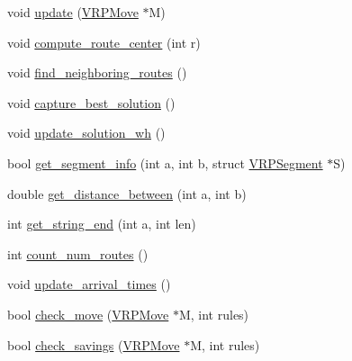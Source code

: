 \begin{DoxyCompactItemize}
\item 
void \hyperlink{class_v_r_p_a6046e20fffcbd601a1f02a42a1a92a0c}{update} (\hyperlink{class_v_r_p_move}{VRPMove} $\ast$M)
\item 
void \hyperlink{class_v_r_p_ae691693a774a5012bb7e77fc9fdee918}{compute\_\-route\_\-center} (int r)
\item 
void \hyperlink{class_v_r_p_acee4564d9d4ed7ddce32ecc7def8b623}{find\_\-neighboring\_\-routes} ()
\item 
void \hyperlink{class_v_r_p_a1de9915c296a739ee5b1e5338889434c}{capture\_\-best\_\-solution} ()
\item 
void \hyperlink{class_v_r_p_a4cd15e9a1a08aeb112bb60ead67f689f}{update\_\-solution\_\-wh} ()
\item 
bool \hyperlink{class_v_r_p_af96ea632c4f247d8430b44a1dd49f2d0}{get\_\-segment\_\-info} (int a, int b, struct \hyperlink{struct_v_r_p_segment}{VRPSegment} $\ast$S)
\item 
double \hyperlink{class_v_r_p_ac43dd1c3af478740817c4e6e4e1e54e7}{get\_\-distance\_\-between} (int a, int b)
\item 
int \hyperlink{class_v_r_p_a6f6c6973bc8fdda2fdb499b35b715f31}{get\_\-string\_\-end} (int a, int len)
\item 
int \hyperlink{class_v_r_p_a6f937aafe71c8de3408386f12bbb1e7c}{count\_\-num\_\-routes} ()
\item 
void \hyperlink{class_v_r_p_aa5233a27a24a804a69c973247c684557}{update\_\-arrival\_\-times} ()
\item 
bool \hyperlink{class_v_r_p_a1c10f1c6714cb3d1215c7f2c4f877b8c}{check\_\-move} (\hyperlink{class_v_r_p_move}{VRPMove} $\ast$M, int rules)
\item 
bool \hyperlink{class_v_r_p_a20d87546b54c2c14e85ff93a8b814248}{check\_\-savings} (\hyperlink{class_v_r_p_move}{VRPMove} $\ast$M, int rules)
\end{DoxyCompactItemize}
